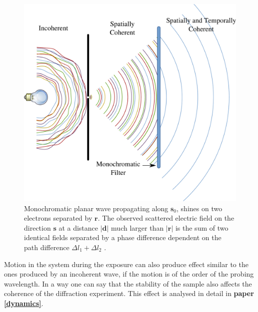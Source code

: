 \begin{figure}[h]
\begin{center}
\includegraphics[width=0.7 \columnwidth]{Diffraction_Theory/coherence.pdf}
\end{center}
\caption{Monochromatic planar wave propagating along $\mathbf s_0$, shines on two
  electrons separated by $\mathbf r$. The observed scattered electric field on the
  direction $\mathbf s$ at a distance $| \mathbf d|$ much larger than $|\mathbf r|$ is the
  sum of two identical fields separated by a phase difference dependent on the
  path difference $\Delta l_1 + \Delta l_2$ \cite{2001International}.}
\label{Fig:two_electrons}
\end{figure}

Motion in the system during the exposure can also produce effect similar to
the ones produced by an incoherent wave, if the motion is of the order of the probing
wavelength. In a way one can say that the stability of the sample also affects
the coherence of the diffraction experiment. This effect is analysed in detail
in {\bf paper \ref{dynamics}}.

